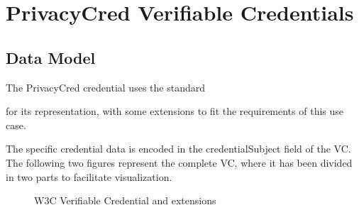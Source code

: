 \documentclass[a4paper,12pt,english,openany]{sphinxmanual}
\begin{document}
\begin{sphinxVerbatim}[commandchars=\\\{\}]
         
    \PYG{p}{],}
     \PYG{p}{[}
         
         
         
         
    \PYG{p}{],}
     
     
\end{sphinxVerbatim}


\section{PrivacyCred Verifiable Credentials}
\label{\detokenize{privacycred:privacycred-verifiable-credentials}}

\subsection{Data Model}
\label{\detokenize{privacycred:data-model}}
\sphinxAtStartPar
The PrivacyCred credential uses the standard %
\begin{footnote}[7]\sphinxAtStartFootnote
{}
%
\end{footnote} for its representation, with some extensions to fit the requirements of this use case.

\sphinxAtStartPar
The specific credential data is encoded in the credentialSubject field of the VC. The following two figures represent the complete VC, where it has been divided in two parts to facilitate visualization.

\begin{figure}[htbp]
\centering
\capstart

\noindent{}
\caption{W3C Verifiable Credential and extensions}\label{\detokenize{privacycred:id8}}\end{figure}
\end{document}
